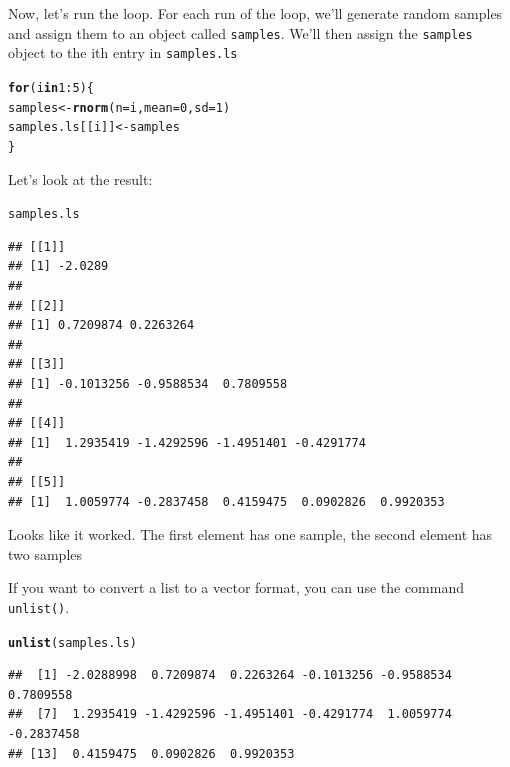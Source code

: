 \documentclass{tufte-book}\usepackage[]{graphicx}\usepackage[]{color}
\makeatletter
\newcommand{\hlnum}[1]{\textcolor[rgb]{0.686,0.059,0.569}{#1}}%
\newcommand{\hlopt}[1]{\textcolor[rgb]{0,0,0}{#1}}%
\newcommand{\hlstd}[1]{\textcolor[rgb]{0.345,0.345,0.345}{#1}}%
\newcommand{\hlkwa}[1]{\textcolor[rgb]{0.161,0.373,0.58}{\textbf{#1}}}%
\newcommand{\hlkwb}[1]{\textcolor[rgb]{0.69,0.353,0.396}{#1}}%
\newcommand{\hlkwc}[1]{\textcolor[rgb]{0.333,0.667,0.333}{#1}}%
\newcommand{\hlkwd}[1]{\textcolor[rgb]{0.737,0.353,0.396}{\textbf{#1}}}%
\newenvironment{kframe}{%
 \def\at@end@of@kframe{}%
 \ifinner\ifhmode%
  \def\at@end@of@kframe{\end{minipage}}%
  \begin{minipage}{\columnwidth}%
 \fi\fi%
 \def\FrameCommand##1{\hskip\@totalleftmargin \hskip-\fboxsep
 \colorbox{shadecolor}{##1}\hskip-\fboxsep
     \hskip-\linewidth \hskip-\@totalleftmargin \hskip\columnwidth}%
 \MakeFramed {\advance\hsize-\width
   \@totalleftmargin\z@ \linewidth\hsize
   \@setminipage}}%
 {\par\unskip\endMakeFramed%
 \at@end@of@kframe}
\newenvironment{knitrout}{}{} %
\makeatother
\begin{document}
Now, let's run the loop. For each run of the loop, we'll generate random samples and assign them to an object called \texttt{samples}. We'll then assign the \texttt{samples} object to the ith entry in \texttt{samples.ls}

\begin{knitrout}
\color{fgcolor}\begin{kframe}
\begin{alltt}
\hlkwa{for}\hlstd{(i} \hlkwa{in} \hlnum{1}\hlopt{:}\hlnum{5}\hlstd{) \{}
  \hlstd{samples} \hlkwb{<-} \hlkwd{rnorm}\hlstd{(}\hlkwc{n} \hlstd{= i,} \hlkwc{mean} \hlstd{=} \hlnum{0}\hlstd{,} \hlkwc{sd} \hlstd{=} \hlnum{1}\hlstd{)}
  \hlstd{samples.ls[[i]]} \hlkwb{<-} \hlstd{samples}
\hlstd{\}}
\end{alltt}
\end{kframe}
\end{knitrout}

Let's look at the result:

\begin{knitrout}
\color{fgcolor}\begin{kframe}
\begin{alltt}
\hlstd{samples.ls}
\end{alltt}
\begin{verbatim}
## [[1]]
## [1] -2.0289
## 
## [[2]]
## [1] 0.7209874 0.2263264
## 
## [[3]]
## [1] -0.1013256 -0.9588534  0.7809558
## 
## [[4]]
## [1]  1.2935419 -1.4292596 -1.4951401 -0.4291774
## 
## [[5]]
## [1]  1.0059774 -0.2837458  0.4159475  0.0902826  0.9920353
\end{verbatim}
\end{kframe}
\end{knitrout}

Looks like it worked. The first element has one sample, the second element has two samples

If you want to convert a list to a vector format, you can use the command \texttt{unlist()}.

\begin{knitrout}
\color{fgcolor}\begin{kframe}
\begin{alltt}
\hlkwd{unlist}\hlstd{(samples.ls)}
\end{alltt}
\begin{verbatim}
##  [1] -2.0288998  0.7209874  0.2263264 -0.1013256 -0.9588534  0.7809558
##  [7]  1.2935419 -1.4292596 -1.4951401 -0.4291774  1.0059774 -0.2837458
## [13]  0.4159475  0.0902826  0.9920353
\end{verbatim}
\end{kframe}
\end{knitrout}
\end{document}
